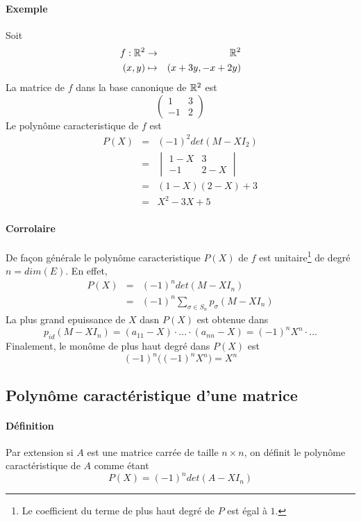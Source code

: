 \paragraph{Exemple} Soit 
\begin{eqnarray*}
  f: \mathbb{R}^2 &\rightarrow& \mathbb{R}^2 \\
  (x, y) &\mapsto& (x + 3y, -x + 2y)
\end{eqnarray*}
La matrice de $f$ dans la base canonique de $\mathbb{R}^2$ est 
$$\begin{pmatrix} 1 & 3 \\ -1 & 2 \end{pmatrix}$$
Le polynôme caracteristique de $f$ est
\begin{eqnarray*}
  P(X) &=& (-1)^2 det(M-X I_2) \\
    &=& \begin{vmatrix} 1-X & 3 \\ -1 & 2-X \end{vmatrix} \\
    &=& (1-X)(2-X) + 3 \\
    &=& X^2 -3X + 5 
\end{eqnarray*}

\paragraph{Corrolaire} De façon générale le polynôme caracteristique $P(X)$ de $f$ est unitaire\footnote{Le coefficient du terme de plus haut degré de $P$ est égal à $1$.} de degré $n = dim(E)$. En effet,
\begin{eqnarray*}
  P(X) &=& (-1)^n det(M-X I_n) \\
   &=& (-1)^n \sum_{\sigma \in S_n} p_{\sigma}(M- X I_n)
\end{eqnarray*}
La plus grand epuissance de $X$ dasn $P(X)$ est obtenue dans
$$p_{id}(M - X I_n) = (a_{11} - X) \cdot \ldots \cdot (a_{nn} - X) = (-1)^n X^n \cdot \ldots$$
Finalement, le monôme de plus haut degré dans $P(X)$ est 
$$(-1)^n \big( (-1)^n X^n \big) = X^n$$

%
\subsection{Polynôme caractéristique d'une matrice}
%
\paragraph{Définition} Par extension si $A$ est une matrice carrée de taille $n\times n$, on définit le polynôme caractéristique de $A$ comme étant
$$P(X) = (-1)^n det(A -X I_n)$$

